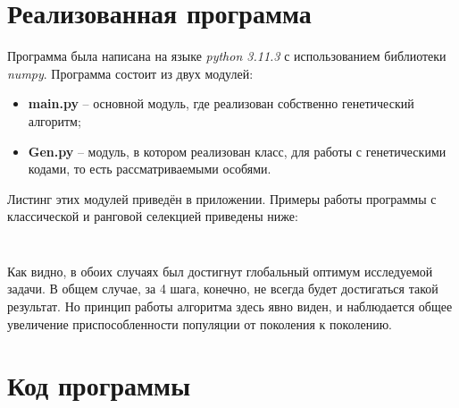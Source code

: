 	\section{Реализованная программа}
	
	Программа была написана на языке \textit{python 3.11.3} с использованием библиотеки \textit{numpy}. Программа состоит из двух модулей: 
	\begin{itemize}
		\item \textbf{main.py} -- основной модуль, где реализован собственно генетический алгоритм;
		\item \textbf{Gen.py} -- модуль, в котором реализован класс, для работы с генетическими кодами, то есть рассматриваемыми особями.
	\end{itemize}

	Листинг этих модулей приведён в приложении. Примеры работы программы с классической и ранговой селекцией приведены ниже:
	
	\label{example1}
	\inputminted[frame=lines,fontsize=\footnotesize,breaklines=true,numbers=left]{text}{Пример1.txt}
	
	\label{example2}
	\inputminted[frame=lines,fontsize=\footnotesize,breaklines=true,numbers=left]{text}{Пример2.txt}
	
	\hspace{1.25cm} Как видно, в обоих случаях был достигнут глобальный оптимум исследуемой задачи. В общем случае, за 4 шага, конечно, не всегда будет достигаться такой результат. Но принцип работы алгоритма здесь явно виден, и наблюдается общее увеличение приспособленности популяции от поколения к поколению.
	
	\appendix
	\renewcommand{\thesection}{\Asbuk{section}}
	\section{Код программы}
	
	\label{main.py}
	\inputminted[frame=lines,fontsize=\footnotesize,breaklines=true,numbers=left]{python}{../Программа/main.py}
	
	\label{Gen.py}
	\inputminted[frame=lines,fontsize=\footnotesize,breaklines=true,numbers=left]{python}{../Программа/Gen.py}
	

